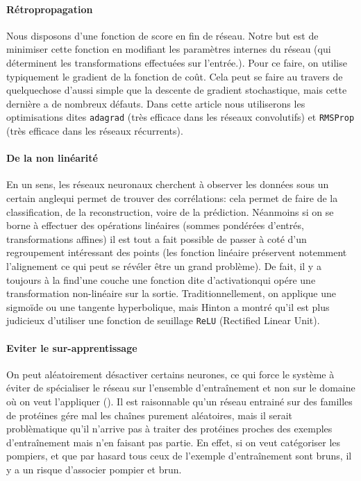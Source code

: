 \documentclass[a4paper, 11pt, onecolumn]{article}
\begin{document}
\paragraph{Rétropropagation}

Nous disposons d'une fonction de score en fin de réseau. Notre but est de
minimiser cette fonction en modifiant les paramètres internes du réseau (qui
déterminent les transformations effectuées sur l'entrée.). Pour ce faire, on
utilise typiquement le gradient de la fonction de coût. Cela peut se faire au
travers de quelquechose d'aussi simple que la descente de gradient stochastique, mais cette
dernière a de nombreux défauts. Dans cette article nous utiliserons les
optimisations dites \texttt{adagrad} (très efficace dans les réseaux
convolutifs) et \texttt{RMSProp} (très efficace dans les réseaux récurrents).

\paragraph{De la non linéarité}

En un sens, les réseaux neuronaux cherchent à observer les données \og sous un
certain angle\fg qui permet de trouver des corrélations: cela permet de faire de
la classification, de la reconstruction, voire de la prédiction. Néanmoins si on
se borne à effectuer des opérations linéaires (sommes pondérées
d'entrés, transformations affines) il est tout a fait possible de passer à coté
d'un regroupement intéressant des points (les fonction linéaire préservent
notemment l'alignement ce qui peut se révéler être un grand problème). De fait,
il y a toujours \og à la fin\fg d'une couche une fonction dite \og
d'activation\fg qui opére une transformation non-linéaire sur la sortie.
Traditionnellement, on applique une sigmoïde ou une tangente hyperbolique, mais
Hinton a montré qu'il est plus judicieux d'utiliser une fonction de seuillage
\texttt{ReLU} (Rectified Linear Unit).

\paragraph{Eviter le sur-apprentissage}
  
On peut aléatoirement désactiver certains neurones, ce qui force le système à
 éviter de spécialiser le réseau sur l'ensemble d'entraînement et non sur
le domaine où on veut l'appliquer (\cite{srivastava2014dropout}). Il est raisonnable qu'un réseau
entrainé sur des familles de protéines gére mal les chaînes purement
aléatoires, mais il serait problèmatique qu'il n'arrive pas à
traiter des protéines proches des exemples d'entraînement mais n'en faisant
pas partie. En effet, si on veut catégoriser les pompiers, et que par hasard
tous ceux de l'exemple d'entraînement sont bruns, il y a un risque d'associer
pompier et brun.
\end{document}
